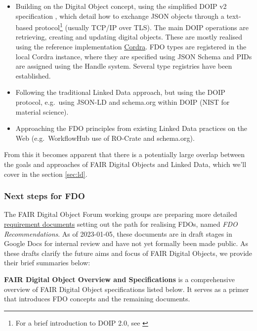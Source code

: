 \documentclass[fleqn,10pt,lineno]{wlpeerjlua}
\providecommand{\tightlist}{%
  \setlength{\itemsep}{0pt}\setlength{\parskip}{0pt}}
\begin{document}
\begin{itemize}
\tightlist
\item
  Building on the Digital Object concept, using the simplified DOIP v2 specification \autocite{foundationDigitalObjectInterface}, which detail how to exchange JSON objects through a text-based protocol\footnote{For a brief introduction to DOIP 2.0, see \autocite{DOIPExamplesCordraa}} (usually TCP/IP over TLS). The main DOIP operations are retrieving, creating and updating digital objects. These are mostly realised using the reference implementation \href{https://cordra.org/}{Cordra}. FDO types are registered in the local Cordra instance, where they are specified using JSON Schema \autocite{Draftbhuttonjsonschema00} and PIDs are assigned using the Handle system. Several type registries have been established.
\item
  Following the traditional Linked Data approach, but using the DOIP protocol, e.g.~using JSON-LD and schema.org within DOIP (NIST for material science).
\item
  Approaching the FDO principles from existing Linked Data practices on the Web (e.g.~WorkflowHub use of RO-Crate and schema.org).
\end{itemize}

From this it becomes apparent that there is a potentially large overlap between the goals and approaches of FAIR Digital Objects and Linked Data, which we'll cover in the section \ref{sec:ld}.


\hypertarget{sec:next-step-fdo}{%
\subsubsection*{Next steps for FDO}\label{sec:next-step-fdo}}

The FAIR Digital Object Forum \autocite{FAIRDigitalObjects} working groups are preparing more detailed \href{https://docs.google.com/spreadsheets/d/1O1PTLmVWqjQgvJsIcPgaZJe9BntHZt8_QndEG0eRwUY/edit}{requirement documents} setting out the path for realising FDOs, named \emph{FDO Recommendations}. As of 2023-01-05, these documents are in draft stages in Google Docs for internal review and have not yet formally been made public. As these drafts clarify the future aims and focus of FAIR Digital Objects, we provide their brief summaries below:

\textbf{FAIR Digital Object Overview and Specifications} \autocite{fdo-Overview} is a comprehensive overview of FAIR Digital Object specifications listed below. It serves as a primer that introduces FDO concepts and the remaining documents.
\end{document}
